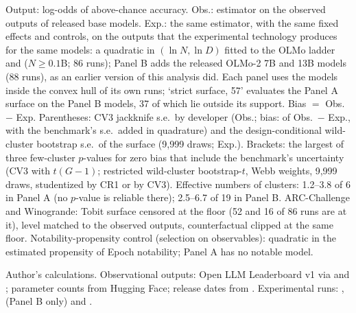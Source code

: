 \begin{table}[tp]
\begin{tablenotes}
Output: log-odds of above-chance accuracy. Obs.: estimator on the observed outputs of released base models. Exp.: the same estimator, with the same fixed effects and controls, on the outputs that the experimental technology produces for the same models: a quadratic in $(\ln N,\ln D)$ fitted to the OLMo ladder and \citet{gadre2024language} ($N\geq0.1$B; 86 runs); Panel B adds the released OLMo-2 7B and 13B models (88 runs), as an earlier version of this analysis did. Each panel uses the models inside the convex hull of its own runs; `strict surface, 57' evaluates the Panel A surface on the Panel B models, 37 of which lie outside its support. Bias $=$ Obs.\ $-$ Exp. Parentheses: CV3 jackknife s.e.\ by developer (Obs.; bias: of Obs.\ $-$ Exp., with the benchmark's s.e.\ added in quadrature) and the design-conditional wild-cluster bootstrap s.e.\ of the surface (9,999 draws; Exp.). Brackets: the largest of three few-cluster $p$-values for zero bias that include the benchmark's uncertainty (CV3 with $t(G-1)$; restricted wild-cluster bootstrap-$t$, Webb weights, 9,999 draws, studentized by CR1 or by CV3). Effective numbers of clusters: 1.2--3.8 of 6 in Panel A (no $p$-value is reliable there); 2.5--6.7 of 19 in Panel B. ARC-Challenge and Winogrande: Tobit surface censored at the floor (52 and 16 of 86 runs are at it), level matched to the observed outputs, counterfactual clipped at the same floor. Notability-propensity control (selection on observables): quadratic in the estimated propensity of Epoch notability; Panel A has no notable model.
\end{tablenotes}
\begin{tablenotes}[Source]
Author's calculations. Observational outputs: Open LLM Leaderboard v1 via \citet{ruan2024observational} and \citet{maiapolo2024sloth}; parameter counts from Hugging Face; release dates from \citet{epochai2026data}. Experimental runs: \citet{bhagia2024establishing}, \citet{teamolmo2024olmo} (Panel B only) and \citet{gadre2024language}.
\end{tablenotes}
\end{table}
